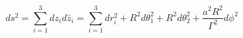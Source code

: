 \begin{equation}
ds^2=\sum_{i=1}^{3}dz_id\bar z_i= \sum_{i=1}^3 dr_i^2+ R^2 d\theta_1^2
+R^2 d\theta_2^2 +\frac{a^2R^2}{\Gamma^2}d\phi^2
\end{equation}

